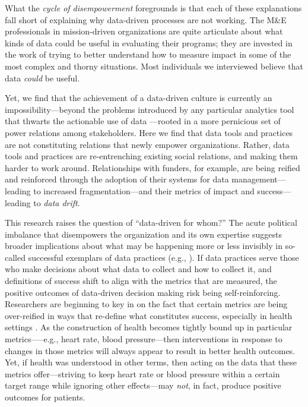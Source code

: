 What the \textit{cycle of disempowerment} foregrounds is that each of these explanations fall short of explaining why data-driven processes are not working. The M\&E professionals in mission-driven organizations are quite articulate about what kinds of data could be useful in evaluating their programs; they are invested in the work of trying to better understand how to measure impact in some of the most complex and thorny situations. Most individuals we interviewed believe that data \textit{could} be useful.

Yet, we find that the achievement of a data-driven culture is currently an impossibility—beyond the problems introduced by any particular analytics tool that thwarts the actionable use of data \citep{Verma2016DrillDown}---rooted in a more pernicious set of power relations among stakeholders. Here we find that data tools and practices are not constituting relations that newly empower organizations. Rather, data tools and practices are re-entrenching existing social relations, and making them harder to work around. Relationships with funders, for example, are being reified and reinforced through the adoption of their systems for data management---leading to increased fragmentation—and their metrics of impact and success---leading to \textit{data drift}.

This research raises the question of “data-driven for whom?” The acute political imbalance that disempowers the organization and its own expertise suggests broader implications about what may be happening more or less invisibly in so-called successful exemplars of data practices (e.g., \cite{Brynjolfsson2011Strength,Lavalle2011Big}). If data practices serve those who make decisions about what data to collect and how to collect it, and definitions of success shift to align with the metrics that are measured, the positive outcomes of data-driven decision making risk being self-reinforcing. Researchers are beginning to key in on the fact that certain metrics are being over-reified in ways that re-define what constitutes success, especially in health settings \citep{Pine2015Politics,Pine2015Emerging}. As the construction of health becomes tightly bound up in particular metrics—--e.g., heart rate, blood pressure—then interventions in response to changes in those metrics will always appear to result in better health outcomes. Yet, if health was understood in other terms, then acting on the data that these metrics offer---striving to keep heart rate or blood pressure within a certain target range while ignoring other effects---may \textit{not}, in fact, produce positive outcomes for patients.

